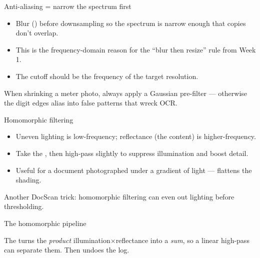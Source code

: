 \documentclass[10pt,aspectratio=169]{beamer}
\begin{document}
\begin{frame}{Anti-aliasing = narrow the spectrum first}
  \begin{itemize}
    \item Blur () before downsampling so the spectrum is narrow enough that copies
          don't overlap.
    \item This is the frequency-domain reason for the ``blur then resize'' rule from Week 1.
    \item The cutoff should be the  frequency of the target resolution.
  \end{itemize}
  \begin{goodbox}
    When shrinking a meter photo, always apply a Gaussian pre-filter — otherwise the digit edges
    alias into false patterns that wreck OCR.
  \end{goodbox}
\end{frame}

\begin{frame}{Homomorphic filtering}
  \begin{itemize}
    \item Uneven lighting is low-frequency; reflectance (the content) is higher-frequency.
    \item Take the , then high-pass slightly to suppress illumination and boost detail.
    \item Useful for a document photographed under a gradient of light — flattens the shading.
  \end{itemize}
  \begin{goodbox}
    Another DocScan trick: homomorphic filtering can even out lighting before thresholding.
  \end{goodbox}
\end{frame}

\begin{frame}{The homomorphic pipeline}
  \begin{center}
  \end{center}
  The  turns the \emph{product} illumination$\times$reflectance into a \emph{sum}, so a linear
  high-pass can separate them. Then  undoes the log.
\end{frame}
\end{document}
